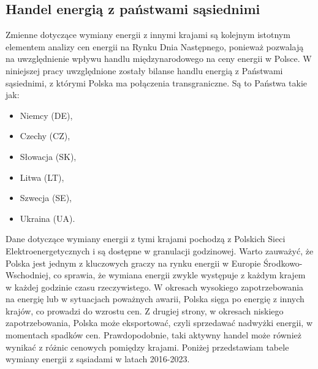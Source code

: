 \subsection{Handel energią z państwami sąsiednimi}
\label{subsec:trade}
Zmienne dotyczące wymiany energii z innymi krajami są kolejnym istotnym elementem analizy cen energii na Rynku Dnia Następnego, ponieważ pozwalają na uwzględnienie wpływu handlu międzynarodowego na ceny energii w Polsce. W niniejszej pracy uwzględnione zostały bilanse handlu energią z Państwami sąsiednimi, z którymi Polska ma połączenia transgraniczne. Są to Państwa takie jak:
\begin{itemize}
    \item Niemcy (DE),
    \item Czechy (CZ),
    \item Słowacja (SK),
    \item Litwa (LT),
    \item Szwecja (SE),
    \item Ukraina (UA).
\end{itemize}

Dane dotyczące wymiany energii z tymi krajami pochodzą z Polskich Sieci Elektroenergetycznych i są dostępne w granulacji godzinowej. Warto zauważyć, że Polska jest jednym z kluczowych graczy na rynku energii w Europie Środkowo-Wschodniej, co sprawia, że wymiana energii zwykle występuje z każdym krajem w każdej godzinie czasu rzeczywistego. W okresach wysokiego zapotrzebowania na energię lub w sytuacjach poważnych awarii, Polska sięga po energię z innych krajów, co prowadzi do wzrostu cen. Z drugiej strony, w okresach niskiego zapotrzebowania, Polska może eksportować, czyli sprzedawać nadwyżki energii, w momentach spadków cen. Prawdopodobnie, taki aktywny handel może również wynikać z różnic cenowych pomiędzy krajami. Poniżej przedstawiam tabele wymiany energii z sąsiadami w latach 2016-2023.

